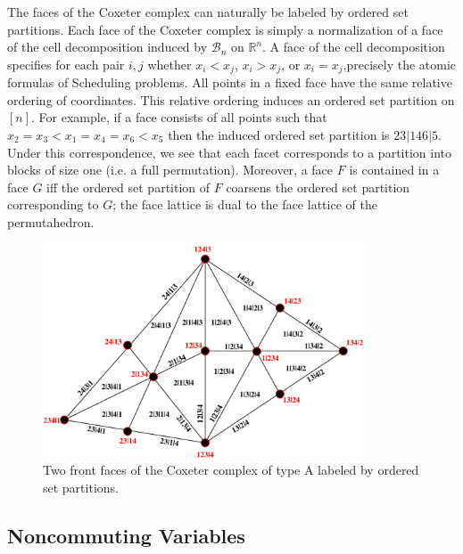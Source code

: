 \documentclass[12pt,reqno]{amsart}
\numberwithin{definition}{section}
\theoremstyle{definition}
\begin{document}
The faces of the Coxeter complex can naturally be labeled by ordered
set partitions.  Each face of the Coxeter complex is simply a
normalization of a face of the cell decomposition induced by
$\mathcal{B}_n$ on $\mathbb{R}^n$.  A face of the cell decomposition specifies for each pair $i,j$ whether $x_i < x_j$, $x_i > x_j$, or $x_i = x_j$,precisely the atomic formulas of Scheduling problems.  All points in a fixed face have
the same relative ordering of coordinates.  This relative ordering
induces an ordered set partition on $[n]$.  For example, if a face
consists of all points such that $x_2 = x_3 < x_1 =
x_4 = x_6 < x_5$ then the induced ordered set partition is
$23|146|5$.  Under this correspondence, we see that each facet
corresponds to a partition into blocks of size one (i.e. a full
permutation).  Moreover, a face $F$ is contained in a face $G$ iff
the ordered set partition of $F$ coarsens the ordered set partition
corresponding to $G$; the face lattice is dual to the face lattice of the permutahedron.

\begin{figure}[h]
\includegraphics[height=2.5in]{Cox.pdf}
\caption{Two front faces of the Coxeter complex of type A labeled by ordered set partitions.}
\end{figure}



\subsection{Noncommuting Variables}


\end{document}
